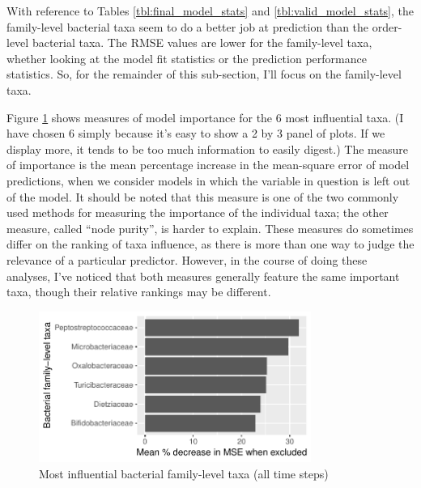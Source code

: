 \documentclass{article}
\begin{document}
With reference to Tables \ref{tbl:final_model_stats} and
\ref{tbl:valid_model_stats}, the family-level bacterial taxa seem to
do a better job at prediction than the order-level bacterial taxa.
The RMSE values are lower for the family-level taxa, whether looking
at the model fit statistics or the prediction performance statistics.
So, for the remainder of this sub-section, I'll focus on the
family-level taxa.

Figure \ref{fig:infl_bac_family_taxa} shows measures of model
importance for the 6 most influential taxa.  (I have chosen 6
simply because it's easy to show a 2 by 3 panel of plots.  If we
display more, it tends to be too much information to easily digest.)
The measure of importance is the mean percentage increase in the
mean-square error of model predictions, when we consider models in
which the variable in question is left out of the model.  It should be
noted that this measure is one of the two commonly used methods for
measuring the importance of the individual taxa; the other measure,
called ``node purity'', is harder to explain.  These measures do
sometimes differ on the ranking of taxa influence, as there is more
than one way to judge the relevance of a particular predictor.
However, in the course of doing these analyses, I've noticed that both
measures generally feature the same important taxa, though their
relative rankings may be different.
\begin{figure}
  \centering
  \includegraphics[width=3.5in]{../revise_algorithm/only_families/all_time_steps/hit_1perc_twice/orig_units_all_data_families_PercIncMSE_barchart}
  \caption{Most influential bacterial family-level taxa (all time steps)}
  \label{fig:infl_bac_family_taxa}
\end{figure}
\end{document}
